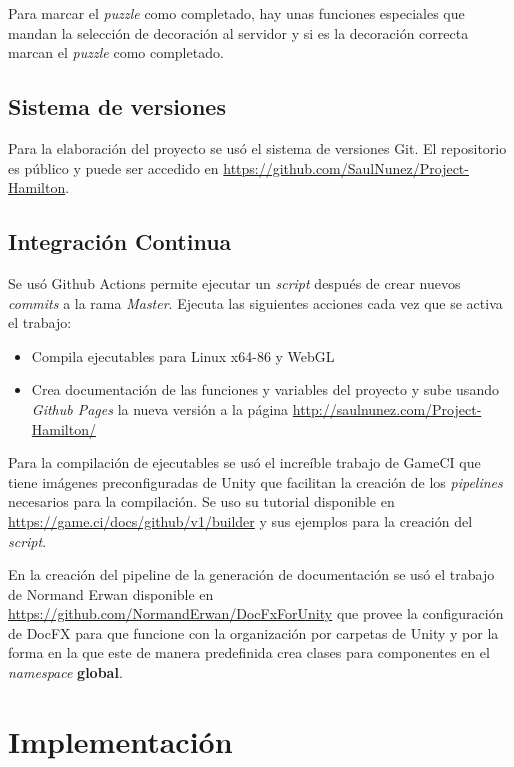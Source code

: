 \begin{itemize}
    Para marcar el \textit{puzzle} como completado, hay unas funciones especiales que mandan la selección de decoración al servidor y si es la decoración correcta marcan el \textit{puzzle} como completado.
\end{itemize}

\subsection{Sistema de versiones}
Para la elaboración del proyecto se usó el sistema de versiones Git. El repositorio es público y puede ser accedido en \url{https://github.com/SaulNunez/Project-Hamilton}.

\subsection{Integración Continua}
Se usó Github Actions permite ejecutar un \textit{script} después de crear nuevos \textit{commits} a la rama \textit{Master}.
Ejecuta las siguientes acciones cada vez que se activa el trabajo:
\begin{itemize}
    \item Compila ejecutables para Linux x64-86 y WebGL
    \item Crea documentación de las funciones y variables del proyecto y sube usando \textit{Github Pages} la nueva versión a la página \url{http://saulnunez.com/Project-Hamilton/}
\end{itemize}

Para la compilación de ejecutables se usó el increíble trabajo de GameCI que tiene imágenes preconfiguradas de Unity que facilitan la creación de los \textit{pipelines} necesarios para la compilación. Se uso su tutorial disponible en \url{https://game.ci/docs/github/v1/builder} y sus ejemplos para la creación del \textit{script}.

En la creación del pipeline de la generación de documentación se usó el trabajo de Normand Erwan disponible en \url{https://github.com/NormandErwan/DocFxForUnity} que provee la configuración de DocFX para que funcione con la organización por carpetas de Unity y por la forma en la que este de manera predefinida crea clases para componentes en el \textit{namespace} \textbf{global}.

\section{Implementación}
